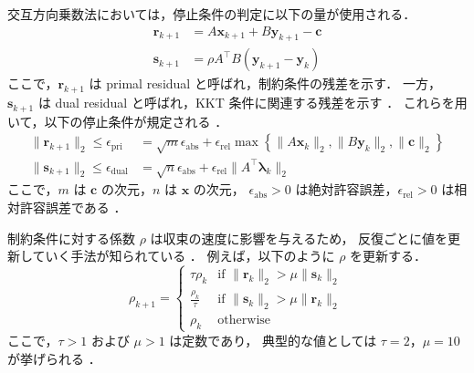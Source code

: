 交互方向乗数法においては，停止条件の判定に以下の量が使用される．
\begin{align}
    \bm{r}_{k+1} & = A \bm{x}_{k+1} + B \bm{y}_{k+1} - \bm{c} \\
    \bm{s}_{k+1} & = \rho A^\top B (\bm{y}_{k+1} - \bm{y}_k)
\end{align}
ここで，$\bm{r}_{k+1}$ は primal residual と呼ばれ，制約条件の残差を示す．
一方，$\bm{s}_{k+1}$ は dual residual と呼ばれ，KKT 条件に関連する残差を示す \cite{Boyd2010}．
これらを用いて，以下の停止条件が規定される \cite{Boyd2010}．
\begin{align}
    \|\bm{r}_{k+1}\|_2 \leq \epsilon_{\text{pri}}  & =
    \sqrt{m} \epsilon_{\text{abs}} + \epsilon_{\text{rel}}
    \max\left\{\|A \bm{x}_{k}\|_2, \|B \bm{y}_{k}\|_2, \|\bm{c}\|_2 \right\}
    \\
    \|\bm{s}_{k+1}\|_2 \leq \epsilon_{\text{dual}} & =
    \sqrt{n} \epsilon_{\text{abs}} + \epsilon_{\text{rel}} \|A^\top \bm{\lambda}_{k}\|_2
\end{align}
ここで，$m$ は $\bm{c}$ の次元，$n$ は $\bm{x}$ の次元，
$\epsilon_{\text{abs}} > 0$ は絶対許容誤差，$\epsilon_{\text{rel}} > 0$ は相対許容誤差である \cite{Boyd2010}．

制約条件に対する係数 $\rho$ は収束の速度に影響を与えるため，
反復ごとに値を更新していく手法が知られている \cite{Boyd2010}．
例えば，以下のように $\rho$ を更新する．
\begin{equation}
    \rho_{k+1} =
    \begin{cases}
        \tau \rho_k                       & \text{if $\|\bm{r}_k\|_2 > \mu \|\bm{s}_k\|_2$} \\
        \displaystyle \frac{\rho_k}{\tau} & \text{if $\|\bm{s}_k\|_2 > \mu \|\bm{r}_k\|_2$} \\
        \rho_k                            & \text{otherwise}
    \end{cases}
\end{equation}
ここで，$\tau > 1$ および $\mu > 1$ は定数であり，
典型的な値としては $\tau = 2$，$\mu = 10$ が挙げられる \cite{Boyd2010}．
